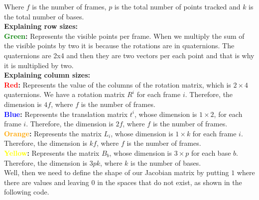 \noindent Where $f$ is the number of frames, $p$ is the total number of points tracked and $k$ is the total number of bases.\\

\noindent \textbf{Explaining row sizes:}\\
\noindent \textbf{\textcolor{green}{Green}:} Represents the visible points per frame. When we multiply the sum of the visible points by two it is because the rotations are in quaternions. The quaternions are 2x4 and then they are two vectors per each point and that is why it is multiplied by two.\\ 

\noindent \textbf{Explaining column sizes:}\\

\noindent \textbf{\textcolor{red}{Red}:} Represents the value of the columns of the rotation matrix, which is $2\times 4$ quaternions. We have a rotation matrix $R^{i}$ for each frame $i$. Therefore, the dimension is $4f$, where $f$ is the number of frames.\\ 

\noindent \textbf{\textcolor{blue}{Blue}:} Represents the translation matrix $t^{i}$, whose dimension is $1\times 2$, for each frame $i$. Therefore, the dimension is $2f$, where $f$ is the number of frames.\\

\noindent \textbf{\textcolor{orange}{Orange}:} Represents the matrix $L_{i}$, whose dimension is $1\times k$ for each frame $i$. Therefore, the dimension is $kf$, where $f$ is the number of frames.\\

\noindent \textbf{\textcolor{yellow}{Yellow}:} Represents the matrix $B_{b}$, whose dimension is $3\times p$ for each base $b$. Therefore, the dimension is $3pk$, where $k$ is the number of bases.\\

\noindent Well, then we need to define the shape of our Jacobian matrix by putting $1$ where there are values and leaving $0$ in the spaces that do not exist, as shown in the following code.\\

